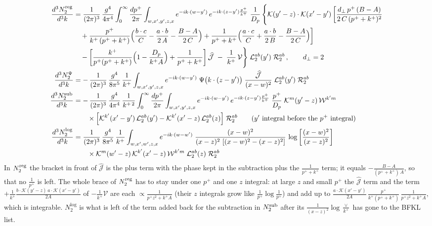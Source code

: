 \documentclass[9pt]{article}
\numberwithin{equation}{section}
\begin{document}
\begin{align}
\frac{d^{3}N_{2}^{\rm reg}}{d^{3}k} & = \frac{1}{(2\pi)^{3}}\,\frac{g^{4}}{4\pi^{4}}\int_{0}^{\infty}\frac{dp^{+}}{2\pi}\int_{w,x',y',z,x} e^{-ik\cdot (w-y')}\,e^{-ik\cdot(z-y')\frac{p^{+}}{k^{+}}}\;\frac{1}{D_{p}}\,\Bigg\{\mathcal{K}(y'-z)\cdot\mathcal{K}(x'-y')\,\bigg[\frac{d_{\perp}\,p^{+}\,(B-A)}{2\,C\,(p^{+}+k^{+})^{2}}\notag \\ & \quad+\frac{p^{+}}{k^{+}\,(p^{+}+k^{+})}\Big(\frac{b\cdot c}{C} -\frac{a\cdot b}{2\,A}-\frac{B-A}{2\,C}\Big) +\frac{1}{p^{+}+k^{+}}\Big(\frac{a\cdot c}{C}+\frac{a\cdot b}{2\,B} -\frac{B-A}{2\,C}\Big)\bigg]\notag \\ & \quad-\bigg[\frac{k^{+}}{p^{+}(p^{+}+k^{+})}\Big(1-\frac{D_{p}}{k^{+}A}\Big)+\frac{1}{p^{+}+k^{+}}\bigg]\,\widehat{\mathcal{J}}\;-\;\frac{1}{k^{+}}\,\mathcal{V}\Bigg\}\;\mathcal{L}_{2}^{ab}(y')\;\mathcal{R}_{2}^{ab}\,,\qquad d_{\perp}=2\\
\frac{d^{3}N_{2}^{\Psi}}{d^{3}k} & = -\,\frac{1}{(2\pi)^{3}}\,\frac{g^{4}}{8\pi^{5}}\,\frac{1}{k^{+}}\int_{w,x',y',z,x} e^{-ik\cdot (w-y')}\;\Psi\big(k\cdot(z-y')\big)\;\frac{\widehat{\mathcal{J}}}{(x-w)^{2}}\;\mathcal{L}_{2}^{ab}(y')\;\mathcal{R}_{2}^{ab}\\
\frac{d^{3}N_{2}^{\rm sub}}{d^{3}k} & = -\,\frac{1}{(2\pi)^{3}}\,\frac{g^{4}}{4\pi^{4}}\,\frac{1}{k^{+\,2}}\int_{0}^{\infty}\frac{dp^{+}}{2\pi}\int_{w,x',y',z,x} e^{-ik\cdot (w-y')}\,e^{-ik\cdot(z-y')\frac{p^{+}}{k^{+}}}\;\frac{p^{+}}{D_{p}}\;\mathcal{K}^{m}(y'-z)\,\mathcal{W}^{k'm}\notag \\ & \qquad\times\Big[\mathcal{K}^{k'}(x'-y')\,\mathcal{L}_{2}^{ab}(y')-\mathcal{K}^{k'}(x'-z)\,\mathcal{L}_{2}^{ab}(z)\Big]\;\mathcal{R}_{2}^{ab}\qquad\text{($y'$ integral before the $p^{+}$ integral)}\\
\frac{d^{3}N_{2}^{\log}}{d^{3}k} & = \frac{1}{(2\pi)^{3}}\,\frac{g^{4}}{8\pi^{5}}\,\frac{1}{k^{+}}\int_{w,x',w',z,x} e^{-ik\cdot (w-w')}\;\frac{(x-w)^{2}}{(x-z)^{2}\,\left[(x-w)^{2}-(x-z)^{2}\right]}\,\log\left[\frac{(x-w)^{2}}{(x-z)^{2}}\right]\notag \\ & \qquad\times\mathcal{K}^{m}(w'-z)\,\mathcal{K}^{k'}(x'-z)\,\mathcal{W}^{k'm}\;\mathcal{L}_{2}^{ab}(z)\;\mathcal{R}_{2}^{ab}
\end{align}
In $N_{2}^{\rm reg}$ the bracket in front of $\widehat{\mathcal{J}}$ is the plus term with the phase kept in the subtraction plus the $\frac{1}{p^{+}+k^{+}}$ term; it equals $-\frac{B-A}{(p^{+}+k^{+})\,A}$, so that no $\frac{1}{p^{+}}$ is left. The whole brace of $N_{2}^{\rm reg}$ has to stay under one $p^{+}$ and one $z$ integral: at large $z$ and small $p^{+}$ the $\widehat{\mathcal{J}}$ term and the term $+\frac{1}{k^{+}}\frac{b\cdot\mathcal{K}(y'-z)\,a\cdot\mathcal{K}(x'-y')}{2A}$ of $-\frac{1}{k^{+}}\mathcal{V}$ are each $\propto\frac{1}{p^{+}z^{2}+k^{+}A}$ (their $z$ integrals grow like $\frac{1}{p^{+}}\log\frac{1}{p^{+}}$) and add up to $\frac{a\cdot\mathcal{K}(x'-y')}{2A}\,\frac{p^{+}}{k^{+}(p^{+}+k^{+})}\,\frac{1}{p^{+}z^{2}+k^{+}A}$, which is integrable. $N_{2}^{\log}$ is what is left of the term added back for the subtraction in $N_{2}^{\rm sub}$ after its $\frac{1}{(x-z)^{2}}\log\frac{\vee}{k^{+}}$ has gone to the BFKL list.\par
\end{document}
